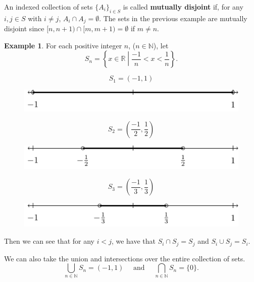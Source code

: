 \documentclass[
]{book}
\theoremstyle{definition}
\theoremstyle{definition}
\newtheorem{example}{Example}[chapter]
\theoremstyle{definition}
\theoremstyle{remark}
\begin{document}
An indexed collection of sets \(\{A_i\}_{i\in S}\) is called \textbf{mutually disjoint} if, for any \(i,j\in S\) with \(i\neq j\), \(A_i \cap A_j = \emptyset\). The sets in the previous example are mutually disjoint since \([n,n+1) \cap [m,m+1) = \emptyset\) if \(m\neq n\).

\begin{example}
\protect\hypertarget{exm:unnamed-chunk-31}{}{\label{exm:unnamed-chunk-31} }For each positive integer \(n\), (\(n\in \mathbb{N}\)), let \[S_n= \left\{x\in \mathbb{R}\middle \vert \frac{-1}{n} < x < \frac{1}{n} \right\}.\]

\[S_1=(-1,1)\]
\end{example}
\begin{figure}

{\centering \includegraphics[width=0.35\linewidth]{tikz/Nested_s1} 

}

\end{figure}

\[S_2=(\frac{-1}{2}, \frac{1}{2})\]

\begin{figure}

{\centering \includegraphics[width=0.35\linewidth]{tikz/Nested_s2} 

}

\end{figure}

\[S_3=(\frac{-1}{3}, \frac{1}{3})\]

\begin{figure}

{\centering \includegraphics[width=0.35\linewidth]{tikz/Nested_s3} 

}

\end{figure}

Then we can see that for any \(i<j\), we have that \(S_i\cap S_j = S_j\) and \(S_i \cup S_j = S_i\).

We can also take the union and intersections over the entire collection of sets.
\[ \bigcup_{n\in \mathbb{N}} S_n = (-1,1) \quad \mbox{ and } \quad \bigcap_{n\in \mathbb{N}} S_n = \{0\}.\]
\end{document}
